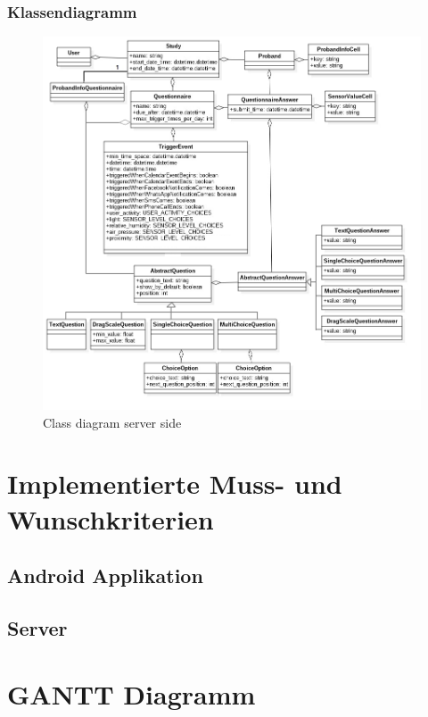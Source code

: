 \documentclass[a4paper]{scrreprt}
\begin{document}
            \subsection{Klassendiagramm}
                \begin{figure}[H]
                    \centering
                    \includegraphics[scale = 0.5]{class_diagram_server.jpg}
                    \caption{Class diagram server side}
                \end{figure}


        \newpage
    \chapter{Implementierte Muss- und Wunschkriterien}


        \section{Android Applikation}





        \section{Server}


           \newpage
    \chapter{GANTT Diagramm}
\end{document}
